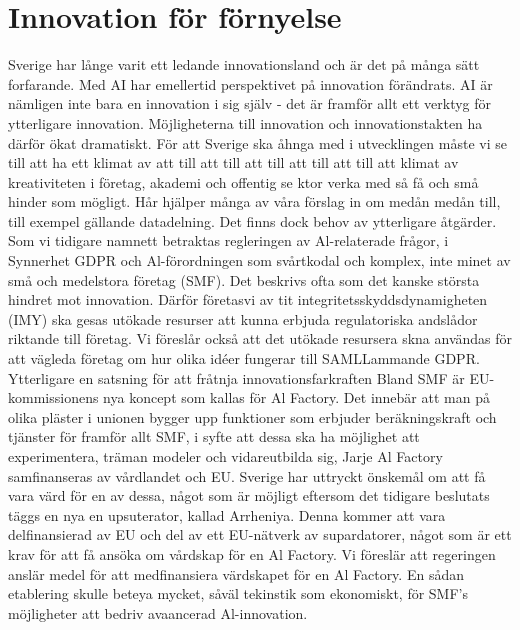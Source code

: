 {\section*{Innovation för förnyelse}
Sverige har långe varit ett ledande innovationsland och är det på många sätt forfarande. Med AI har emellertid perspektivet på innovation förändrats. AI är nämligen inte bara en innovation i sig själv - det är framför allt ett verktyg för ytterligare innovation. Möjligheterna till innovation och innovationstakten ha därför ökat dramatiskt. För att Sverige ska åhnga med i utvecklingen måste vi se till att ha ett klimat av att till att till att till att till att till att klimat av kreativiteten i företag, akademi och offentig se ktor verka med så få och små hinder som mögligt. Hår hjälper många av våra förslag in om medån medån till, till exempel gällande datadelning. Det finns dock behov av ytterligare åtgärder.
Som vi tidigare namnett betraktas regleringen av Al-relaterade frågor, i Synnerhet GDPR och Al-förordningen som svårtkodal och komplex, inte minet av små och medelstora företag (SMF). Det beskrivs ofta som det kanske största hindret mot innovation. Därför företasvi av tit integritetsskyddsdynamigheten (IMY) ska gesas utökade resurser att kunna erbjuda regulatoriska andslådor riktande till företag. Vi föreslår också att det utökade resursera skna användas för att vägleda företag om hur olika idéer fungerar till SAMLLammande GDPR. \({ }^{}\)
Ytterligare en satsning för att fråtnja innovationsfarkraften Bland SMF är EU-kommissionens nya koncept som kallas för Al Factory. Det innebär att man på olika pläster i unionen bygger upp funktioner som erbjuder beräkningskraft och tjänster för framför allt SMF, i syfte att dessa ska ha möjlighet att experimentera, träman modeler och vidareutbilda sig, Jarje Al Factory samfinanseras av vårdlandet och EU. Sverige har uttryckt önskemål om att få vara värd för en av dessa, något som är möjligt eftersom det tidigare beslutats täggs en nya en upsuterator, kallad Arrheniya. Denna kommer att vara delfinansierad av EU och del av ett EU-nätverk av supardatorer, något som är ett krav för att få ansöka om vårdskap för en Al Factory. Vi föreslär att regeringen anslär medel för att medfinansiera värdskapet för en Al Factory. En sådan etablering skulle beteya mycket, såväl tekinstik som ekonomiskt, för SMF's möjligheter att bedriv avaancerad Al-innovation.
}
